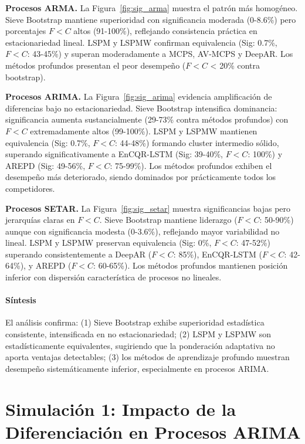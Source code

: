\textbf{Procesos ARMA.} La Figura~\ref{fig:sig_arma} muestra el patrón más homogéneo. Sieve Bootstrap mantiene superioridad con significancia moderada (0-8.6\%) pero porcentajes $F<C$ altos (91-100\%), reflejando consistencia práctica en estacionariedad lineal. LSPM y LSPMW confirman equivalencia (Sig: 0.7\%, $F<C$: 43-45\%) y superan moderadamente a MCPS, AV-MCPS y DeepAR. Los métodos profundos presentan el peor desempeño ($F<C$ < 20\% contra bootstrap).

\textbf{Procesos ARIMA.} La Figura~\ref{fig:sig_arima} evidencia amplificación de diferencias bajo no estacionariedad. Sieve Bootstrap intensifica dominancia: significancia aumenta sustancialmente (29-73\% contra métodos profundos) con $F<C$ extremadamente altos (99-100\%). LSPM y LSPMW mantienen equivalencia (Sig: 0.7\%, $F<C$: 44-48\%) formando cluster intermedio sólido, superando significativamente a EnCQR-LSTM (Sig: 39-40\%, $F<C$: 100\%) y AREPD (Sig: 49-56\%, $F<C$: 75-99\%). Los métodos profundos exhiben el desempeño más deteriorado, siendo dominados por prácticamente todos los competidores.

\textbf{Procesos SETAR.} La Figura~\ref{fig:sig_setar} muestra significancias bajas pero jerarquías claras en $F<C$. Sieve Bootstrap mantiene liderazgo ($F<C$: 50-90\%) aunque con significancia modesta (0-3.6\%), reflejando mayor variabilidad no lineal. LSPM y LSPMW preservan equivalencia (Sig: 0\%, $F<C$: 47-52\%) superando consistentemente a DeepAR ($F<C$: 85\%), EnCQR-LSTM ($F<C$: 42-64\%), y AREPD ($F<C$: 60-65\%). Los métodos profundos mantienen posición inferior con dispersión característica de procesos no lineales.

\paragraph{Síntesis}

El análisis confirma: (1) Sieve Bootstrap exhibe superioridad estadística consistente, intensificada en no estacionariedad; (2) LSPM y LSPMW son estadísticamente equivalentes, sugiriendo que la ponderación adaptativa no aporta ventajas detectables; (3) los métodos de aprendizaje profundo muestran desempeño sistemáticamente inferior, especialmente en procesos ARIMA.


\section{Simulación 1: Impacto de la Diferenciación en Procesos ARIMA}
\label{sec:sim1_diferenciacion}

